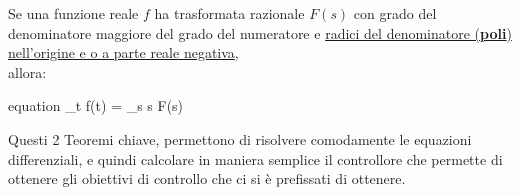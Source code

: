 \begin{teorema}
	Se una funzione reale $ f  $ ha trasformata razionale $ F(s) $ con grado del denominatore maggiore del grado del numeratore e \underline{radici del denominatore (\textbf{poli}) nell’origine e o a parte reale negativa},\\
	allora:
	\begin{empheq}[box=\mathResult]{equation} \label{eq:valFinale}
		\lim\limits_{t \rightarrowtail \infty} f(t) = \lim\limits_{s } s \cdot F(s)
	\end{empheq}
\end{teorema}

Questi 2 Teoremi chiave, permettono di risolvere comodamente le equazioni differenziali, e quindi calcolare in maniera semplice il controllore che permette di ottenere gli obiettivi di controllo che ci si è prefissati di ottenere.

\newpage

